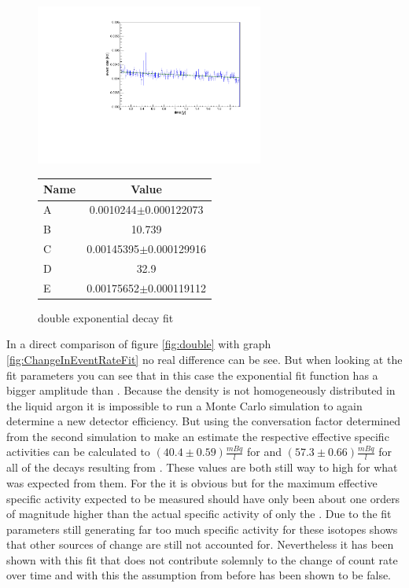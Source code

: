 \documentclass[encoding=utf8,british]{tumphthesis}
\begin{document}
\begin{figure}[t!]
	\centering
	\begin{minipage}{.5\textwidth}
	\centering
	\ifmakefigures%
	\includegraphics[width=75mm]{./Bilder/doppelt.pdf}
	\fi%
	\caption{double exponential decay fit}
	\label{fig:double}
	\end{minipage}%
	\begin{minipage}{.5\textwidth}
    \centering
    \begin{tabular}{|l|c|}
        \hline
        Name  & Value \\
        \hline
        A     & 0.0010244$\pm$0.000122073 \\
        \hline
        B    & 10.739 \\
        \hline
        C   & 0.00145395$\pm$0.000129916 \\
        \hline
        D  & 32.9 \\
        \hline
        E & 0.00175652$\pm$0.000119112 \\
        \hline
    \end{tabular}
    \label{tab:doubleFitpara}
	\end{minipage}
\end{figure}


In a direct comparison of figure \ref{fig:double} with graph \ref{fig:ChangeInEventRateFit} no real difference can be see.
But when looking at the fit parameters you can see that in this case the  exponential fit function has a bigger amplitude than \Kr.
Because the  density is not homogeneously distributed in the liquid argon it is impossible to run a Monte Carlo simulation to again determine a new detector efficiency.
But using the conversation factor determined from the second simulation to make an estimate the respective effective specific activities can be calculated to $(40.4\pm0.59)\frac{\unit{mBq}}{\unit{l}}$ for \Kr and $(57.3\pm0.66)\frac{\unit{mBq}}{\unit{l}}$ for all of the decays resulting from .
These values are both still way to high for what was expected from them.
For the \Kr it is obvious but for  the maximum effective specific activity expected to be measured should have only been about one orders of magnitude higher than the actual specific activity of only the .
Due to the fit parameters still generating far too much specific activity for these isotopes shows that other sources of change are still not accounted for.
Nevertheless it has been shown with this fit that \Kr does not contribute solemnly to the change of count rate over time and with this the assumption from before has been shown to be false.
\\
\end{document}
